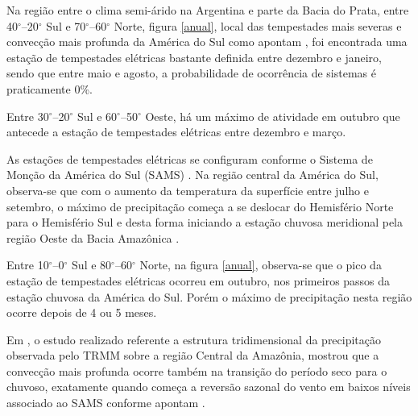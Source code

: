  

Na região entre o clima semi-árido na Argentina e parte da Bacia do Prata, entre 40$^{\circ}$--20$^{\circ}$ Sul e 70$^{\circ}$--60$^{\circ}$ Norte, figura \ref{anual}, local das tempestades mais severas e convecção mais profunda da América do Sul como apontam , foi encontrada uma estação de tempestades elétricas bastante definida entre dezembro e janeiro, sendo que entre maio e agosto, a probabilidade de ocorrência de sistemas é praticamente 0\%.%

Entre 30$^{\circ}$--20$^{\circ}$ Sul e 60$^{\circ}$--50$^{\circ}$ Oeste, há um máximo de atividade em outubro que antecede a estação de tempestades elétricas entre dezembro e março. 

As estações de tempestades elétricas se configuram conforme o Sistema de Monção da América do Sul (SAMS) . Na região central da América do Sul, observa-se que com o aumento da temperatura da superfície entre julho e setembro, o máximo de precipitação começa a se deslocar do Hemisfério Norte para o Hemisfério Sul e desta forma iniciando a estação chuvosa meridional pela região Oeste da Bacia Amazônica \cite{Zhou1998,grimm2003nino,reboita2010regimes,Marengo2012, bombardi2008variabilidade}.

Entre 10$^{\circ}$--0$^{\circ}$ Sul e 80$^{\circ}$--60$^{\circ}$ Norte,  na figura \ref{anual}, observa-se que o pico da estação de tempestades elétricas ocorreu em outubro, nos primeiros passos da estação chuvosa da América do Sul. Porém o máximo de precipitação nesta região ocorre depois de 4 ou 5 meses. 

Em , o estudo realizado referente a estrutura tridimensional da precipitação observada pelo TRMM sobre a região Central da Amazônia, mostrou que a convecção mais profunda ocorre também na transição do período seco para o chuvoso, exatamente quando começa a reversão sazonal do vento em baixos níveis associado ao SAMS conforme apontam .

